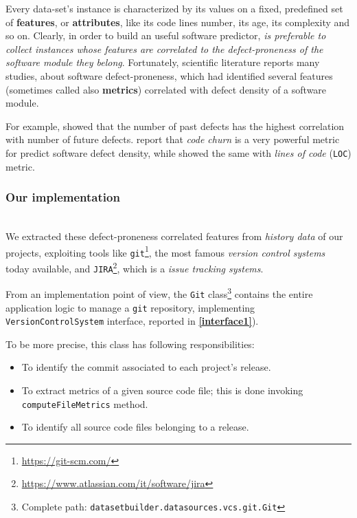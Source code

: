 \documentclass[sigconf]{acmart}
\begin{document}
Every data-set's instance is characterized by its values on a fixed, predefined set of \textbf{features}, or \textbf{attributes}, like its code lines number, its age, its complexity and so on. Clearly, in order to build an useful software predictor, \textit{is preferable to collect instances whose features are correlated to the defect-proneness of the software module they belong}. Fortunately, scientific literature reports many studies, about software defect-proneness, which had identified several features (sometimes called also \textbf{metrics}) correlated with defect density of a software module. 

For example, \citet{PredictingDefectsForEclipse} showed that the number of past defects has the highest correlation with number of future defects. \citet{Nagappan} report that \textit{code churn} is a very powerful metric for predict software defect density, while \citet{Gyimothy} showed the same with \textit{lines of code} (\texttt{LOC}) metric.

\subsubsection{Our implementation}
\hfill\\

We extracted these defect-proneness correlated features from \textit{history data} of our projects, exploiting tools like \texttt{git}\footnote{\url{https://git-scm.com/}}, the most famous \textit{version control systems} today available, and \texttt{JIRA}\footnote{\url{https://www.atlassian.com/it/software/jira}}, which is a \textit{issue tracking systems}.

From an implementation point of view, the \texttt{Git} class\footnote{Complete path: \texttt{datasetbuilder.datasources.vcs.git.Git}} contains the entire application logic to manage a \texttt{git} repository, implementing \texttt{Version\-Control\-System} interface, reported in \textbf{\cref{interface1}}). 

To be more precise, this class has following responsibilities: 
\begin{itemize}
\item To identify the commit associated to each project's release.
\item To extract metrics of a given source code file; this is done invoking \texttt{compute\-File\-Metrics} method.
\item To identify all source code files belonging to a release.
\end{itemize}
\end{document}
